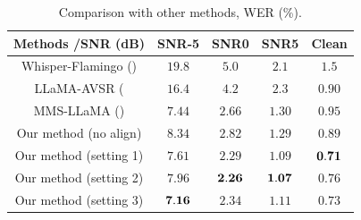 \documentclass[conference]{IEEEtran}
\begin{document}
\begin{table}[tbh]
	\centering
	\caption{Comparison with other methods, WER (\%).}
	\begin{tabular}{|c||c||c||c||c|}
		\hline
		Methods /SNR (dB) &SNR-5 & SNR0 & SNR5 & Clean \\	
		\hline	
		\hline		
		Whisper-Flamingo (\cite{WFlamingo2024}) & $19.8$ &$5.0$ &$2.1$ &$1.5$ \\
		\hline		
		LLaMA-AVSR (\cite{CappellazzoICASSP2025} &$ 16.4$& $4.2$& $2.3$& $0.90$ \\ 
		\hline		
		MMS-LLaMA (\cite{MMSLLAMA2025}) &$ {7.44} $ & $2.66$ & $1.30$ & $0.95$ \\ 
		\hline		
		\hline	
		\rowcolor{lightgray}
		Our method (no align)  & $8.34$ &  $2.82$ & $1.29$ & $0.89$ \\		
		\hline	
		\rowcolor{lightgray}
		Our method (setting 1)  & $7.61$ &  $2.29$ & $1.09$ & $ {\bf 0.71}$ \\		
		\hline	
		\rowcolor{lightgray}
		Our method (setting 2)  & $7.96$ & $\bf 2.26$ & $\bf 1.07$ & $0.76$ \\	
		\hline	
		\rowcolor{lightgray}
		Our method (setting 3)  & ${\bf 7.16}$ & $ 2.34$ & $1.11$ & $0.73$ \\										
		\hline									
	\end{tabular}
	\label{tab:tab5}
\end{table}
\end{document}

